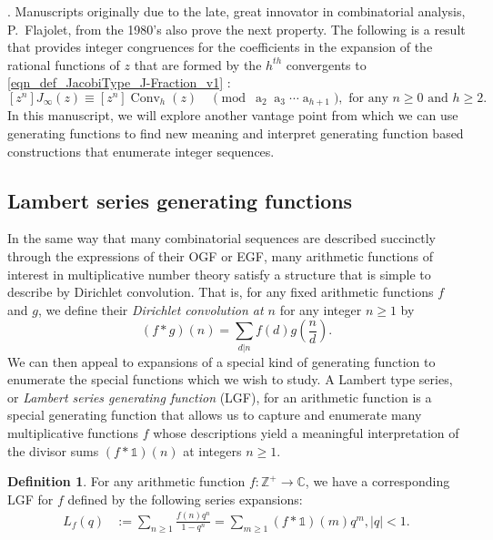 \documentclass[12pt,reqno,a4letter]{article}
\numberwithin{figure}{section}
\numberwithin{table}{section}
\numberwithin{equation}{section}
\let\citep\cite
\newcommand{\cf}{\textit{cf.~}}
\DeclareMathOperator{\ab}{a}
\DeclareMathOperator{\Conv}{Conv}
\theoremstyle{plain}
\numberwithin{theorem}{section}
\theoremstyle{definition}
\newtheorem{definition}[theorem]{Definition}
\begin{document}
\citep[\cf \S 3.10]{NISTHB} \citep{WALL-CFRACS}. 
Manuscripts originally due to the late, great innovator in combinatorial analysis, P.~Flajolet, 
from the 1980's also prove the next property. The following is a 
result that provides integer congruences for the coefficients in the expansion 
of the rational functions of $z$ that are formed by the $h^{th}$ convergents 
to \eqref{eqn_def_JacobiType_J-Fraction_v1} \cite{FLAJOLET80B,FLAJOLET82}: 
\[
[z^n] J_{\infty}(z) \equiv [z^n] \Conv_h(z) \quad \pmod{\ab_2\ab_3 \cdots \ab_{h+1}}, 
	\text{ for any } n \geq 0 \text{ and } h \geq 2. 
\]
In this manuscript, we will explore another vantage point from which 
we can use generating functions to find new meaning and interpret generating function 
based constructions that enumerate integer sequences. 

\subsection{Lambert series generating functions}

In the same way that many combinatorial sequences are described succinctly through the 
expressions of their OGF or EGF, many arithmetic functions of interest in multiplicative number theory 
satisfy a structure that is simple to describe by Dirichlet convolution. 
That is, for any fixed arithmetic functions $f$ and $g$, we define their 
\emph{Dirichlet convolution at $n$} for any integer $n \geq 1$ by 
$$(f \ast g)(n) = \sum_{d|n} f(d) g\left(\frac{n}{d}\right).$$
We can then appeal to expansions of a special kind of generating function to enumerate the 
special functions which we wish to study. 
A Lambert type series, or \emph{Lambert series generating function} (LGF), for an arithmetic function
is a special generating function that allows us to capture and enumerate many multiplicative functions 
$f$ whose descriptions yield a meaningful interpretation of the divisor sums 
$(f \ast \mathds{1})(n)$ at integers $n \geq 1$. 
\nocite{CATALOG-INTDIRSERIES}

\begin{definition}
For any arithmetic function $f: \mathbb{Z}^{+} \rightarrow \mathbb{C}$, we have a corresponding 
LGF for $f$ defined by the following series expansions:
\begin{align} 
\label{eqn_Lfq_LSeriesGF_def_v1} 
L_f(q) & := \sum_{n \geq 1} \frac{f(n) q^n}{1-q^n} = \sum_{m \geq 1} (f \ast \mathds{1})(m) q^m, |q| < 1.
\end{align}
\end{definition}
\end{document}
